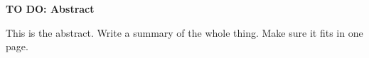 \newpage
{\normalfont\Huge\sffamily\bfseries TO DO: Abstract}
\vspace{24pt}

This is the abstract. Write a summary of the whole thing. Make 
sure it fits in one page. 

\newpage
\vspace*{\fill}
